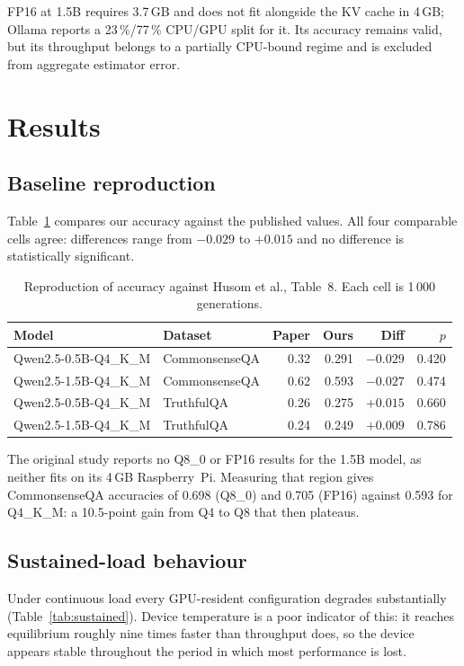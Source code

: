 \documentclass[11pt,a4paper]{article}
\begin{document}
FP16 at 1.5B requires 3.7\,GB and does not fit alongside the KV cache in 4\,GB;
Ollama reports a 23\,\%/77\,\% CPU/GPU split for it. Its accuracy remains valid,
but its throughput belongs to a partially CPU-bound regime and is excluded from
aggregate estimator error.

\section{Results}

\subsection{Baseline reproduction}
Table~\ref{tab:repro} compares our accuracy against the published values. All
four comparable cells agree: differences range from $-0.029$ to $+0.015$ and no
difference is statistically significant.

\begin{table}[h]
\centering
\caption{Reproduction of accuracy against Husom et al., Table~8. Each cell is
1\,000 generations.}
\label{tab:repro}
\begin{tabular}{llrrrr}
\toprule
Model & Dataset & Paper & Ours & Diff & $p$ \\
\midrule
Qwen2.5-0.5B-Q4\_K\_M & CommonsenseQA & 0.32 & 0.291 & $-0.029$ & 0.420 \\
Qwen2.5-1.5B-Q4\_K\_M & CommonsenseQA & 0.62 & 0.593 & $-0.027$ & 0.474 \\
Qwen2.5-0.5B-Q4\_K\_M & TruthfulQA    & 0.26 & 0.275 & $+0.015$ & 0.660 \\
Qwen2.5-1.5B-Q4\_K\_M & TruthfulQA    & 0.24 & 0.249 & $+0.009$ & 0.786 \\
\bottomrule
\end{tabular}
\end{table}

The original study reports no Q8\_0 or FP16 results for the 1.5B model, as
neither fits on its 4\,GB Raspberry~Pi. Measuring that region gives
CommonsenseQA accuracies of 0.698 (Q8\_0) and 0.705 (FP16) against 0.593 for
Q4\_K\_M: a 10.5-point gain from Q4 to Q8 that then plateaus.

\subsection{Sustained-load behaviour}
Under continuous load every GPU-resident configuration degrades substantially
(Table~\ref{tab:sustained}). Device temperature is a poor indicator of this:
it reaches equilibrium roughly nine times faster than throughput does, so the
device appears stable throughout the period in which most performance is lost.
\end{document}
